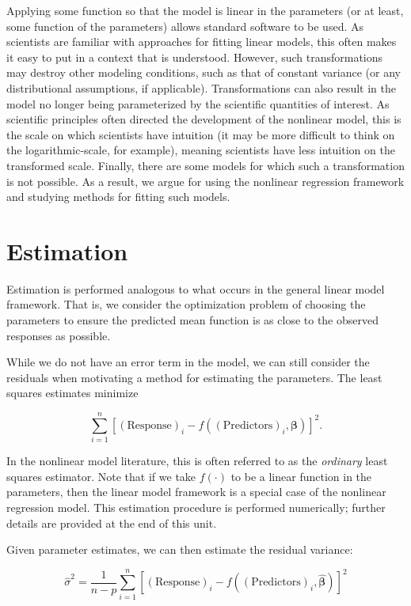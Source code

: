\documentclass[
]{book}
\theoremstyle{plain}
\theoremstyle{mydefn}
\theoremstyle{myexmpl}
\theoremstyle{remark}
\begin{document}
Applying some function so that the model is linear in the parameters (or at least, some function of the parameters) allows standard software to be used. As scientists are familiar with approaches for fitting linear models, this often makes it easy to put in a context that is understood. However, such transformations may destroy other modeling conditions, such as that of constant variance (or any distributional assumptions, if applicable). Transformations can also result in the model no longer being parameterized by the scientific quantities of interest. As scientific principles often directed the development of the nonlinear model, this is the scale on which scientists have intuition (it may be more difficult to think on the logarithmic-scale, for example), meaning scientists have less intuition on the transformed scale. Finally, there are some models for which such a transformation is not possible. As a result, we argue for using the nonlinear regression framework and studying methods for fitting such models.

\hypertarget{estimation}{%
\section{Estimation}\label{estimation}}

Estimation is performed analogous to what occurs in the general linear model framework. That is, we consider the optimization problem of choosing the parameters to ensure the predicted mean function is as close to the observed responses as possible.

While we do not have an error term in the model, we can still consider the residuals when motivating a method for estimating the parameters. The least squares estimates minimize

\[\sum\limits_{i=1}^{n} \left[(\text{Response})_i - f\left((\text{Predictors})_i, \boldsymbol{\beta}\right)\right]^2.\]

In the nonlinear model literature, this is often referred to as the \emph{ordinary} least squares estimator. Note that if we take \(f(\cdot)\) to be a linear function in the parameters, then the linear model framework is a special case of the nonlinear regression model. This estimation procedure is performed numerically; further details are provided at the end of this unit.

Given parameter estimates, we can then estimate the residual variance:

\[\widehat{\sigma}^2 = \frac{1}{n-p} \sum\limits_{i=1}^{n} \left[(\text{Response})_i - f\left((\text{Predictors})_i, \widehat{\boldsymbol{\beta}}\right)\right]^2\]
\end{document}
